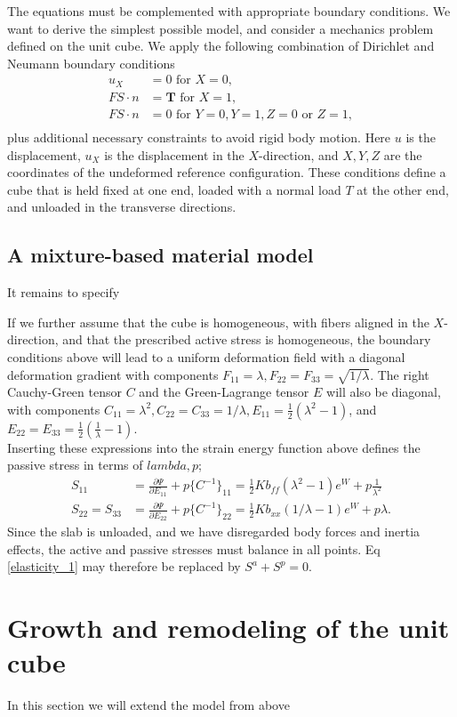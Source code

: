 \documentclass[twoside,12pt,a4paper]{article}
\begin{document}
The equations must be complemented with appropriate boundary conditions. We want to derive 
the simplest possible model, and consider a mechanics problem defined on the unit cube. 
We apply the following combination of Dirichlet and Neumann boundary conditions
\begin{align*}
u_X & = 0 \mbox{ for  } X = 0, \\
FS \cdot n &= \boldsymbol{T} \mbox{ for  } X = 1, \\
FS \cdot n &= 0 \mbox{ for  } Y = 0, Y = 1, Z = 0 \mbox{ or } Z = 1, \\
\end{align*}
plus additional necessary constraints to avoid rigid body motion. Here $u$ is the displacement, 
$u_X$ is the displacement in the $X$-direction, and $X,Y,Z$ are the coordinates of the undeformed
reference configuration. These conditions define a cube that is held fixed at one end, loaded with 
a normal load $T$ at the other end, and unloaded in the transverse directions. 

\subsection{A mixture-based material model}
It remains to specify 









If we further assume that the cube is homogeneous, with fibers aligned in the $X$-direction, and
that the prescribed active stress is homogeneous, the boundary conditions above will lead to a 
uniform deformation field with a diagonal deformation gradient with components
$F_{11} = \lambda, F_{22}=F_{33} = \sqrt{1/\lambda}$.
The right Cauchy-Green tensor $C$ and the Green-Lagrange tensor
$E$ will also be diagonal, with components $C_{11} = \lambda^2 , 
C_{22} =C_{33} = 1/\lambda,  
E_{11} = \frac{1}{2}(\lambda^2 - 1)$, and 
$E_{22} = E_{33} = \frac{1}{2}(\frac{1}{\lambda}-1).$\\

Inserting these expressions into the strain energy function above
defines the passive stress in terms of $lambda,p$;
\begin{align}
S_{11} &= \frac{\partial\Psi}{\partial E_{11}}+p\{ C^{-1}\}_{11}  =
\frac{1}{2}Kb_{ff}(\lambda^2-1)e^W + p\frac{1}{\lambda^2} \nonumber\\
S_{22} = S_{33} &=  \frac{\partial\Psi}{\partial E_{22}}+p\{ C^{-1}\}_{22} 
= \frac{1}{2}K b_{xx}(1/\lambda -1)e^W + p\lambda .\nonumber  
\end{align}
Since the slab is unloaded, and we have disregarded body forces and inertia effects, 
the active and passive stresses must balance in all points. Eq \eqref{elasticity_1}
may therefore be replaced by $S^a + S^p = 0.$ 

\section{Growth and remodeling of the unit cube}
In this section we will extend the model from above 
\end{document}

